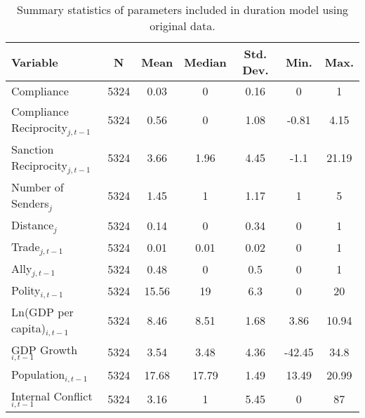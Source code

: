 \begin{table}[ht]
\centering
{\normalsize
\begin{tabular}{lcccccc}
 Variable & N & Mean & Median & Std. Dev. & Min. & Max. \\ 
  \hline
\hline
Compliance & 5324 & 0.03 & 0 & 0.16 & 0 & 1 \\ 
  Compliance Reciprocity$_{j,t-1}$ & 5324 & 0.56 & 0 & 1.08 & -0.81 & 4.15 \\ 
  Sanction Reciprocity$_{j,t-1}$ & 5324 & 3.66 & 1.96 & 4.45 & -1.1 & 21.19 \\ 
  Number of Senders$_{j}$ & 5324 & 1.45 & 1 & 1.17 & 1 & 5 \\ 
  Distance$_{j}$ & 5324 & 0.14 & 0 & 0.34 & 0 & 1 \\ 
  Trade$_{j,t-1}$ & 5324 & 0.01 & 0.01 & 0.02 & 0 & 1 \\ 
  Ally$_{j,t-1}$ & 5324 & 0.48 & 0 & 0.5 & 0 & 1 \\ 
  Polity$_{i,t-1}$ & 5324 & 15.56 & 19 & 6.3 & 0 & 20 \\ 
  Ln(GDP per capita)$_{i,t-1}$ & 5324 & 8.46 & 8.51 & 1.68 & 3.86 & 10.94 \\ 
  GDP Growth$_{i,t-1}$ & 5324 & 3.54 & 3.48 & 4.36 & -42.45 & 34.8 \\ 
  Population$_{i,t-1}$ & 5324 & 17.68 & 17.79 & 1.49 & 13.49 & 20.99 \\ 
  Internal Conflict$_{i,t-1}$ & 5324 & 3.16 & 1 & 5.45 & 0 & 87 \\ 
   \hline
\hline
\end{tabular}
}
\caption{Summary statistics of parameters included in duration model using original data.} 
\label{tab:summNoImp}
\end{table}
